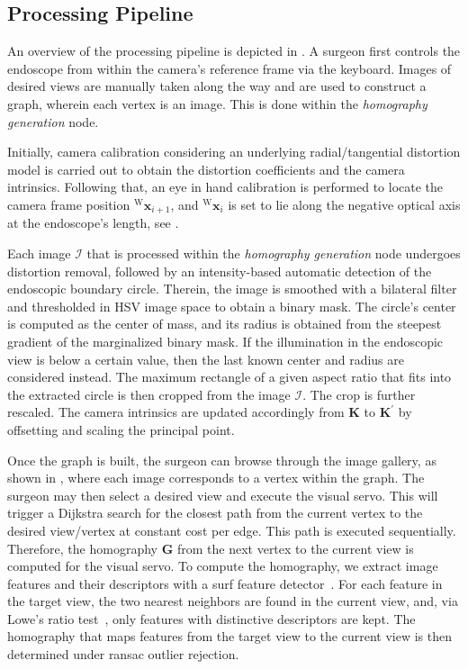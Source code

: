 \subsection{Processing Pipeline}
\label{c2:sec:pipe}

An overview of the processing pipeline is depicted in . A surgeon first controls the endoscope from within the camera's reference frame via the keyboard. Images of desired views are manually taken along the way and are used to construct a graph, wherein each vertex is an image. This is done within the \textit{homography generation} node. 

Initially, camera calibration considering an underlying radial/tangential distortion model is carried out to obtain the distortion coefficients and the camera intrinsics. Following that, an eye in hand calibration is performed to locate the camera frame position $^\text{W}\mathbf{x}_{i+1}$, and $^\text{W}\mathbf{x}_i$ is set to lie along the negative optical axis at the endoscope's length, see . 

Each image $\mathcal{I}$ that is processed within the \textit{homography generation} node undergoes distortion removal, followed by an intensity-based automatic detection of the endoscopic boundary circle. Therein, the image is smoothed with a bilateral filter and thresholded in HSV image space to obtain a binary mask. The circle's center is computed as the center of mass, and its radius is obtained from the steepest gradient of the marginalized binary mask. If the illumination in the endoscopic view is below a certain value, then the last known center and radius are considered instead. The maximum rectangle of a given aspect ratio that fits into the extracted circle is then cropped from the image $\mathcal{I}$. The crop is further rescaled. The camera intrinsics are updated accordingly from $\mathbf{K}$ to $\mathbf{K}^\prime$ by offsetting and scaling the principal point. 

Once the graph is built, the surgeon can browse through the image gallery, as shown in , where each image corresponds to a vertex within the graph. The surgeon may then select a desired view and execute the visual servo. This will trigger a Dijkstra search for the closest path from the current vertex to the desired view/vertex at constant cost per edge. This path is executed sequentially. Therefore, the homography $\mathbf{G}$ from the next vertex to the current view is computed for the visual servo. To compute the homography, we extract image features and their descriptors with a \gls{surf} feature detector~\cite{bay2006surf}. For each feature in the target view, the two nearest neighbors are found in the current view, and, via Lowe's ratio test~\cite{lowe2004distinctive}, only features with distinctive descriptors are kept. The homography that maps features from the target view to the current view is then determined under \gls{ransac} outlier rejection.

